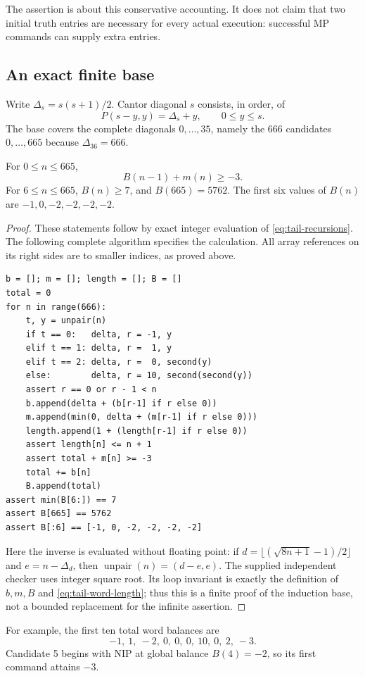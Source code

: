 The assertion is about this conservative accounting. It does not claim
that two initial truth entries are necessary for every actual execution:
successful MP commands can supply extra entries.

\subsection{An exact finite base}

Write $\Delta_s=s(s+1)/2$. Cantor diagonal $s$ consists, in order, of
\[
 P(s-y,y)=\Delta_s+y,\qquad 0\leq y\leq s.
\]
The base covers the complete diagonals $0,\ldots,35$, namely the 666
candidates $0,\ldots,665$ because $\Delta_{36}=666$.

\begin{lemma}
\label{lem:tail-finite-base}
For $0\leq n\leq665$,
\[
 B(n-1)+m(n)\geq-3.
\]
For $6\leq n\leq665$, $B(n)\geq7$, and $B(665)=5762$.
The first six values of $B(n)$ are
$-1,0,-2,-2,-2,-2$.
\end{lemma}

\begin{proof}
These statements follow by exact integer evaluation of
\eqref{eq:tail-recursions}. The following complete algorithm specifies
the calculation. All array references on its right sides are to
smaller indices, as proved above.
\begin{verbatim}
b = []; m = []; length = []; B = []
total = 0
for n in range(666):
    t, y = unpair(n)
    if t == 0:   delta, r = -1, y
    elif t == 1: delta, r =  1, y
    elif t == 2: delta, r =  0, second(y)
    else:        delta, r = 10, second(second(y))
    assert r == 0 or r - 1 < n
    b.append(delta + (b[r-1] if r else 0))
    m.append(min(0, delta + (m[r-1] if r else 0)))
    length.append(1 + (length[r-1] if r else 0))
    assert length[n] <= n + 1
    assert total + m[n] >= -3
    total += b[n]
    B.append(total)
assert min(B[6:]) == 7
assert B[665] == 5762
assert B[:6] == [-1, 0, -2, -2, -2, -2]
\end{verbatim}
Here the inverse is evaluated without floating point:
if $d=\lfloor(\sqrt{8n+1}-1)/2\rfloor$ and $e=n-\Delta_d$,
then $\operatorname{unpair}(n)=(d-e,e)$.
The supplied independent checker uses integer square root.
Its loop invariant is exactly the definition of $b,m,B$ and
\eqref{eq:tail-word-length}; thus this is a finite proof of the induction
base, not a bounded replacement for the infinite assertion.
\end{proof}

For example, the first ten total word balances are
\[
 -1,\ 1,\ -2,\ 0,\ 0,\ 0,\ 10,\ 0,\ 2,\ -3.
\]
Candidate 5 begins with NIP at global balance $B(4)=-2$,
so its first command attains $-3$.

